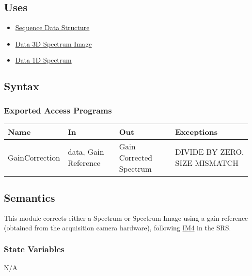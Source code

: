 \documentclass[12pt, titlepage]{article}
\begin{document}
\subsection{Uses}
\begin{itemize}
    \item \hyperref[Mod:Seq]{Sequence Data Structure}
    \item \hyperref[Mod:SI]{Data 3D Spectrum Image}
    \item \hyperref[Mod:Spectrum]{Data 1D Spectrum}
\end{itemize}

\subsection{Syntax}

\subsubsection{Exported Access Programs}

\begin{center}
    \begin{tabular}{p{3cm} p{4cm} p{4cm} p{4cm}}
        \hline
        \textbf{Name} & \textbf{In} & \textbf{Out} & \textbf{Exceptions} \\
        \hline
        GainCorrection & data, Gain Reference & Gain Corrected Spectrum & DIVIDE BY
        ZERO, SIZE MISMATCH \\
        \hline
    \end{tabular}
\end{center}

\subsection{Semantics}
This module corrects either a Spectrum or Spectrum Image using a gain reference
(obtained from the acquisition camera hardware), following \hyperref[gain]{IM4}
in the SRS.

\subsubsection{State Variables}
N/A
\end{document}
